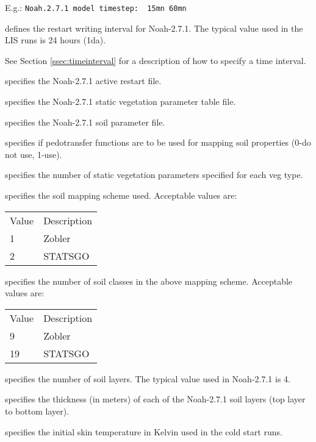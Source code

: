  E.g.: \quad \verb+Noah.2.7.1 model timestep:  15mn 60mn+

  defines the restart
 writing interval for Noah-2.7.1. The typical value used in the
 LIS runs is 24 hours (1da).

 See Section \ref{ssec:timeinterval} for a description
 of how to specify a time interval.

  specifies the Noah-2.7.1 active
 restart file.

  specifies the
 Noah-2.7.1 static vegetation parameter table file.

  specifies the
 Noah-2.7.1 soil parameter file.

  specifies if
 pedotransfer functions are to be used for mapping soil properties
 (0-do not use, 1-use).

 specifies the number of static vegetation
 parameters specified for each veg type.

  specifies the soil mapping scheme used.
 Acceptable values are:

 \begin{tabular}{ll}
 Value & Description \\
 1     & Zobler      \\
 2     & STATSGO     \\
 \end{tabular}

  specifies the number of
 soil classes in the above mapping scheme.
 Acceptable values are:

 \begin{tabular}{ll}
 Value & Description \\
  9    & Zobler      \\
 19    & STATSGO     \\
 \end{tabular}

  specifies the number of
 soil layers. The typical value used in Noah-2.7.1 is 4.

  specifies the thickness (in meters)
 of each of the Noah-2.7.1 soil layers (top layer to bottom layer).

 specifies the initial skin temperature in Kelvin used in the
 cold start runs.


